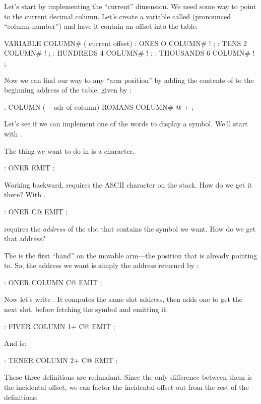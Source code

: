 Let's start by implementing the ``current'' dimension. We need
some way to point to the current decimal column. Let's create a variable
called  (pronounced ``column-number'') and have it contain an
offset into the table:

\begin{Code}
VARIABLE COLUMN#  ( current offset)
: ONES        O COLUMN# ! ;
: TENS        2 COLUMN# ! ;
: HUNDREDS    4 COLUMN# ! ;
: THOUSANDS   6 COLUMN# ! ;
\end{Code}
Now we can find our way to any ``arm position'' by adding the contents of
 to the beginning address of the table, given by
:

\begin{Code}
: COLUMN  ( -- adr of column)  ROMANS  COLUMN# @  + ;
\end{Code}
Let's see if we can implement one of the words to display a symbol. We'll
start with .

The thing we want to do in  is  a character.

\begin{Code}
: ONER                   EMIT ;
\end{Code}
Working backward,  requires the ASCII character on the stack.
How do we get it there? With .

\begin{Code}
: ONER                C@ EMIT ;
\end{Code}
 requires the \emph{address} of the slot that contains the
symbol we want. How do we get that address?

The  is the first ``hand'' on the movable arm---the position
that  is already pointing to. So, the address we want is
simply the address returned by :

\begin{Code}
: ONER   COLUMN       C@ EMIT ;
\end{Code}
Now let's write . It computes the same slot address, then
adds one to get the next slot, before fetching the symbol and emitting it:

\begin{Code}
: FIVER  COLUMN 1+    C@ EMIT ;
\end{Code}
And  is:

\begin{Code}
: TENER  COLUMN 2+    C@ EMIT ;
\end{Code}
These three definitions are redundant. Since the only difference between
them is the incidental offset, we can factor the incidental offset out
from the rest of the definitions:

